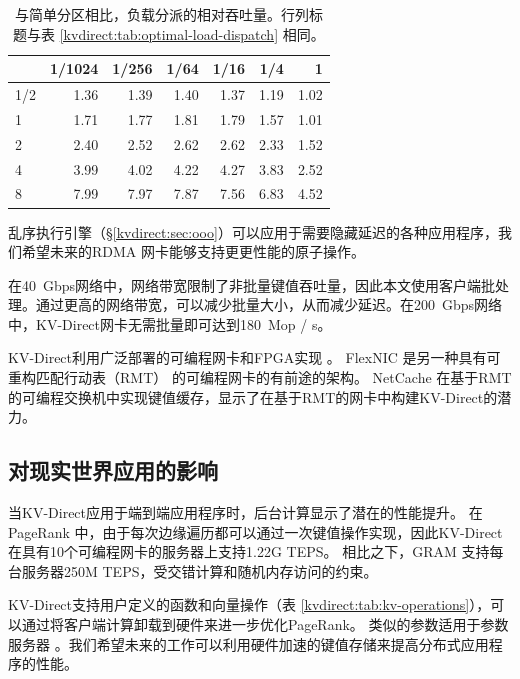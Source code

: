 \begin{table}[htbp]
	\centering
	\caption{与简单分区相比，负载分派的相对吞吐量。行列标题与表 \ref{kvdirect:tab:optimal-load-dispatch} 相同。}
	\label{kvdirect:tab:optimal-load-dispatch-throughput}
	\small
	\begin{tabular}{|l|r|r|r|r|r|r|}
		\hline
		& 1/1024 & 1/256 & 1/64 & 1/16 & 1/4 & 1 \\
		\hline
		1/2 & 1.36	& 1.39	& 1.40	& 1.37	& 1.19	& 1.02 \\ 
		\hline
		1	& 1.71	& 1.77	& 1.81	& 1.79	& 1.57	& 1.01 \\
		\hline
		2	& 2.40	& 2.52	& 2.62	& 2.62	& 2.33	& 1.52 \\
		\hline
		4	& 3.99	& 4.02	& 4.22	& 4.27	& 3.83	& 2.52 \\
		\hline
		8	& 7.99	& 7.97	& 7.87	& 7.56	& 6.83	& 4.52 \\
		\hline
	\end{tabular}
\end{table}


乱序执行引擎（\S \ref {kvdirect:sec:ooo}）可以应用于需要隐藏延迟的各种应用程序，我们希望未来的RDMA 网卡能够支持更更性能的原子操作。

在40~Gbps网络中，网络带宽限制了非批量键值吞吐量，因此本文使用客户端批处理。通过更高的网络带宽，可以减少批量大小，从而减少延迟。在200~Gbps网络中，KV-Direct网卡无需批量即可达到180~Mop / s。

KV-Direct利用广泛部署的可编程网卡和FPGA实现 \cite{putnam2014reconfigurable,caulfield2016cloud}。 FlexNIC \cite {kaufmann2015flexnic,kaufmann2016krishnamurthy} 是另一种具有可重构匹配行动表（RMT） \cite {bosshart2013forwarding} 的可编程网卡的有前途的架构。
NetCache \cite {netcache-sosp17} 在基于RMT的可编程交换机中实现键值缓存，显示了在基于RMT的网卡中构建KV-Direct的潜力。

\subsection{对现实世界应用的影响}

当KV-Direct应用于端到端应用程序时，后台计算显示了潜在的性能提升。 在PageRank \cite {page1999pagerank}中，由于每次边缘遍历都可以通过一次键值操作实现，因此KV-Direct在具有10个可编程网卡的服务器上支持1.22G TEPS。 相比之下，GRAM \cite {wu2015g}支持每台服务器250M TEPS，受交错计算和随机内存访问的约束。

KV-Direct支持用户定义的函数和向量操作（表 \ref {kvdirect:tab:kv-operations}），可以通过将客户端计算卸载到硬件来进一步优化PageRank。 类似的参数适用于参数服务器 \cite {li2014scaling}。我们希望未来的工作可以利用硬件加速的键值存储来提高分布式应用程序的性能。

